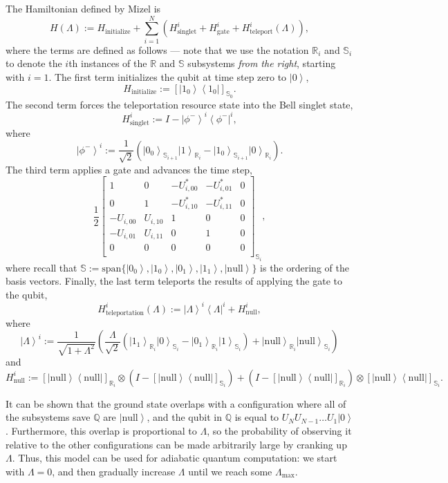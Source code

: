\documentclass[12pt]{amsbook}
\theoremstyle{plain}
\theoremstyle{definition}
\theoremstyle{remark}
\newcommand{\ket}[1]{\left|#1\right>}
\newcommand{\bra}[1]{\left<#1\right|}
\newcommand{\ketbra}[2]{\ket{#1}\!\!\bra{#2}}
\newcommand{\paren}[1]{\left(#1\right)}
\begin{document}
The Hamiltonian defined by Mizel is $$H(\Lambda) := H_{\text{initialize}} + \sum_{i=1}^N\paren{H_{\text{singlet}}^i + H_{\text{gate}}^i + H_\text{teleport}^i(\Lambda)},$$ where the terms are defined as follows --- note that we use the notation $\mathbb{R}_i$ and $\mathbb{S}_i$ to denote the $i$th instances of the $\mathbb{R}$ and $\mathbb{S}$ subsystems \emph{from the right}, starting with $i=1$. 
The first term initializes the qubit at time step zero to $\ket{0}$,
$$H_{\text{initialize}} := [\ketbra{1_0}{1_0}]_{\mathbb{S}_0}.$$
The second term forces the teleportation resource state into the Bell singlet state,
$$H_{\text{singlet}}^i := I - \ket{\phi^{-}}^i\bra{\phi^{-}}^i,$$
where
$$\ket{\phi^{-}}^i := \frac{1}{\sqrt{2}}\paren{\ket{0_0}_{\mathbb{S}_{i+1}}\ket{1}_{\mathbb{R}_i}-\ket{1_0}_{\mathbb{S}_{i+1}}\ket{0}_{\mathbb{R}_i}}.$$
The third term applies a gate and advances the time step,
$$\frac{1}{2}\begin{bmatrix}
1 & 0 & -U_{i,00}^* & -U_{i,01}^* & 0\\
0 & 1 & -U_{i,10}^* & -U_{i,11}^* & 0\\
-U_{i,00} & U_{i,10} & 1 & 0 & 0\\
-U_{i,01} & U_{i,11} & 0 & 1 & 0\\
0 & 0 & 0 & 0 & 0\\
\end{bmatrix}_{\mathbb{S}_i},$$
where recall that $\mathbb{S}:=\text{span}\{\ket{0_0},\ket{1_0},\ket{0_1},\ket{1_1},\ket{\text{null}}\}$ is the ordering of the basis vectors.  Finally, the last term teleports the results of applying the gate to the qubit,
$$H_{\text{teleportation}}^i(\Lambda) := \ket{\Lambda}^i\bra{\Lambda}^i + H_{\text{null}}^i,$$
where
$$\ket{\Lambda}^i := \frac{1}{\sqrt{1+\Lambda^2}}\paren{\frac{\Lambda}{\sqrt{2}}(\ket{1_1}_{\mathbb{R}_i}\ket{0}_{\mathbb{S}_i}-\ket{0_1}_{\mathbb{R}_i}\ket{1}_{\mathbb{S}_i})+\ket{\text{null}}_{\mathbb{R}_i}\ket{\text{null}}_{\mathbb{S}_i}}$$
and
$$H_{\text{null}}^i := [\ketbra{\text{null}}{\text{null}}]_{\mathbb{R}_i}\otimes\paren{I-[\ketbra{\text{null}}{\text{null}}]_{\mathbb{S}_i}}+\paren{I-[\ketbra{\text{null}}{\text{null}}]_{\mathbb{R}_i}}\otimes[\ketbra{\text{null}}{\text{null}}]_{\mathbb{S}_i}.$$

It can be shown that the ground state overlaps with a configuration where all of the subsystems save $\mathbb{Q}$ are $\ket{\text{null}}$, and the qubit in $\mathbb{Q}$ is equal to $U_N U_{N-1}\dots U_1\ket{0}$.  Furthermore, this overlap is proportional to $\Lambda$, so the probability of observing it relative to the other configurations can be made arbitrarily large by cranking up $\Lambda$.  Thus, this model can be used for adiabatic quantum computation:  we start with $\Lambda=0$, and then gradually increase $\Lambda$ until we reach some $\Lambda_{\text{max}}$.
\end{document}
